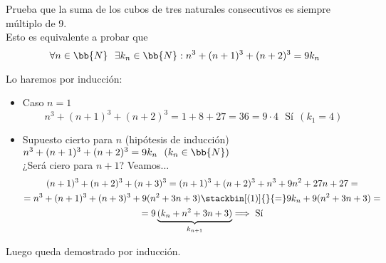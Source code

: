\documentclass[12pt]{article}
\begin{document}
    \begin{ejercicio}[2 puntos]
        Prueba que la suma de los cubos de tres naturales consecutivos es siempre múltiplo de 9.\\

        Esto es equivalente a probar que 
        \[
            \forall n \in \bb{N} \ \ \exists k_n \in \bb{N} : n^3 + (n+1)^3 + (n+2)^3 = 9k_n
        \]

        Lo haremos por inducción:
        \begin{itemize}[label=$\ast$]
            \item Caso $n=1$\\
            \[
                n^3 + (n+1)^3 + (n+2)^3 = 1 + 8 + 27=36 = 9 \cdot 4 \ \ \ \text{Sí} \ \ (k_1=4)
            \]

            \item Supuesto cierto para $n$ (hipótesis de inducción) $n^3 + (n+1)^3 + (n+2)^3 = 9k_n\ \ (k_n \in \bb{N})$\\
            ¿Será ciero para $n+1$? Veamos...\\

            \begin{gather*}
                (n+1)^3+(n+2)^3+(n+3)^3 = (n+1)^3+(n+2)^3+n^3 + 9 n^2 + 27n + 27 =\\
                = n^3 + (n+1) ^3 + (n+3)^3 + 9(n^2 + 3n + 3) \stackbin[(1)]{}{=} 9 k_n + 9(n^2 + 3n + 3) =\\
                = 9\underbrace{(k_n + n^2 + 3n + 3)}_{k_{n+1}} \Longrightarrow \text{ Sí}
            \end{gather*}
        \end{itemize}

        Luego queda demostrado por inducción.
        
    \end{ejercicio}
    
\end{document}
